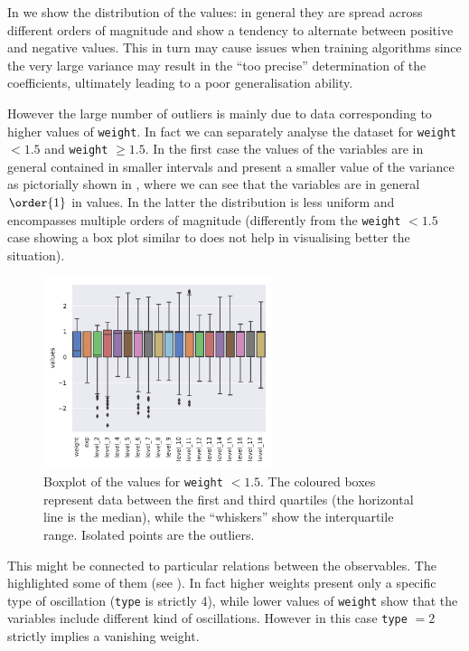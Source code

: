 In  we show the distribution of the values: in general they are spread across different orders of magnitude and show a tendency to alternate between positive and negative values.
This in turn may cause issues when training \ml algorithms since the very large variance may result in the ``too precise'' determination of the coefficients, ultimately leading to a poor generalisation ability.

However the large number of outliers is mainly due to data corresponding to higher values of \texttt{weight}.
In fact we can separately analyse the dataset for \texttt{weight} $< 1.5$ and \texttt{weight} $\ge 1.5$.
In the first case the values of the variables are in general contained in smaller intervals and present a smaller value of the variance as pictorially shown in , where we can see that the variables are in general $\order{1}$ in values.
In the latter the distribution is less uniform and encompasses multiple orders of magnitude (differently from the \texttt{weight} $< 1.5$ case showing a box plot similar to  does not help in visualising better the situation).

\begin{figure}[htbp]
  \centering
  \includegraphics[width=0.6\textwidth]{img/boxplot_low}
  \caption{%
    Boxplot of the values for \texttt{weight} $< 1.5$.
    The coloured boxes represent data between the first and third quartiles (the horizontal line is the median), while the ``whiskers'' show the interquartile range.
    Isolated points are the outliers.
  }
  \label{fig:lumps:box}
\end{figure}

This might be connected to particular relations between the observables. The \eda highlighted some of them (see ).
In fact higher weights present only a specific type of oscillation (\texttt{type} is strictly 4), while lower values of \texttt{weight} show that the variables include different kind of oscillations.
However in this case \texttt{type} $= 2$ strictly implies a vanishing weight.

